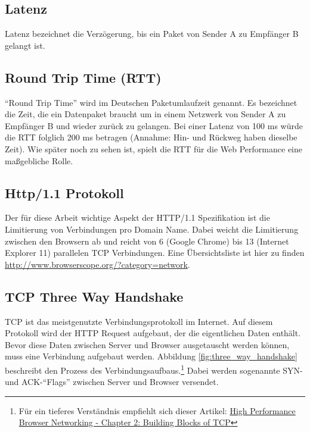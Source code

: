 

	\subsection{Latenz} %
	\label{sub:latenz}
		Latenz bezeichnet die Verzögerung, bis ein Paket von Sender A zu Empfänger B gelangt ist.


	\subsection{Round Trip Time (RTT)} %
	\label{sub:round_trip_time_}
		"`Round Trip Time"' wird im Deutschen Paketumlaufzeit genannt. Es bezeichnet die Zeit, die ein Datenpaket braucht um in einem Netzwerk von Sender A zu Empfänger B und wieder zurück zu gelangen. Bei einer Latenz von 100 ms würde die RTT folglich 200 ms betragen (Annahme: Hin- und Rückweg haben dieselbe Zeit). Wie später noch zu sehen ist, spielt die RTT für die Web Performance eine maßgebliche Rolle.
	


	\subsection{Http/1.1 Protokoll}
	\label{sub:http_1_1_Protokoll}
		Der für diese Arbeit wichtige Aspekt der HTTP/1.1 Spezifikation ist die Limitierung von Verbindungen pro Domain Name. Dabei weicht die Limitierung zwischen den Browsern ab und reicht von 6 (Google Chrome) bis 13 (Internet Explorer 11) parallelen TCP Verbindungen. Eine Übersichtsliste ist hier zu finden \url{http://www.browserscope.org/?category=network}.


	\subsection{TCP Three Way Handshake}
	\label{sub:tcp_three_way_handshake}
		TCP ist das meistgenutzte Verbindungsprotokoll im Internet. Auf diesem Protokoll wird der HTTP Request aufgebaut, der die eigentlichen Daten enthält.
		Bevor diese Daten zwischen Server und Browser ausgetauscht werden können, muss eine Verbindung aufgebaut werden. Abbildung \ref{fig:three_way_handshake} beschreibt den Prozess des Verbindungsaufbaus.\footnote{Für ein tieferes Verständnis empfiehlt sich dieser Artikel: \href{http://chimera.labs.oreilly.com/books/1230000000545/ch02.html}{High Performance Browser Networking - Chapter 2: Building Blocks of TCP}} Dabei werden sogenannte SYN- und ACK-"`Flags"' zwischen Server und Browser versendet.

